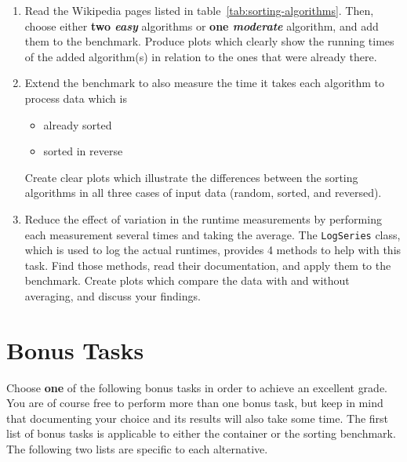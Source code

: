 \documentclass[a4paper,10pt]{article}
\begin{document}
\begin{enumerate}

\item
  Read the Wikipedia pages listed in table~\ref{tab:sorting-algorithms}.
  Then, choose either \textbf{two \emph{easy}} algorithms or \textbf{one \emph{moderate}} algorithm, and add them to the benchmark.
  Produce plots which clearly show the running times of the added algorithm(s) in relation to the ones that were already there.

\item
  Extend the benchmark to also measure the time it takes each algorithm to process data which is
  \begin{itemize}
  \item already sorted
  \item sorted in reverse
  \end{itemize}
  Create clear plots which illustrate the differences between the sorting algorithms in all three cases of input data (random, sorted, and reversed).

\item
  Reduce the effect of variation in the runtime measurements by performing each measurement several times and taking the average.
  The \texttt{LogSeries} class, which is used to log the actual runtimes, provides 4 methods to help with this task.
  Find those methods, read their documentation, and apply them to the benchmark.
  Create plots which compare the data with and without averaging, and discuss your findings.

\end{enumerate}



\section{Bonus Tasks}\label{sec:tasks2}

Choose \textbf{one} of the following bonus tasks in order to achieve an excellent grade.
You are of course free to perform more than one bonus task, but keep in mind that documenting your choice and its results will also take some time.
The first list of bonus tasks is applicable to either the container or the sorting benchmark.
The following two lists are specific to each alternative.
\end{document}
